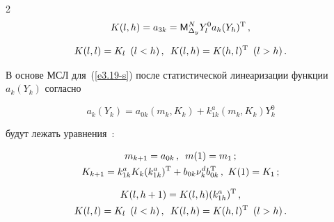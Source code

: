 \begin{multicols}{2}
    \begin{multline*}


    K(l,h) = a_{3k} = {\sf M}_{\Delta_y}^N Y_l^0 a_h (Y_h)^{\mathrm{T}}\,,

    \\[7pt]

     K(l,l) = K_l\enskip (l<h)\,,\enskip

    K(l,h) = K(h,l)^{\mathrm{T}} \enskip (l>h)\,.


    \end{multline*}



В основе МСЛ для~(\ref{e3.19-s}) после статистической линеаризации функции  $a_k(Y_k)$ согласно

    \begin{equation*}

    a_k\left(Y_k\right) = a_{0k} \left(m_k, K_k\right) + k_{1k}^a \left(m_k, K_k\right) Y_k^0


    \end{equation*}

будут лежать уравнения~\cite{4-s, 10-s}:

   \begin{gather*}

   m_{k+1} = a_{0k}\,,\enskip m(1) = m_1\,; %

   \\

    K_{k+1} = k_{1k}^a K_k (k_{1k}^a)^{\mathrm{T}} + b_{0k} \nu_k^d b_{0k}^{\mathrm{T}}\,,\  K(1)= K_1\,; %

\end{gather*}



\vspace*{-12pt}



\noindent

\begin{multline*}

    K(l,h+1) = K(l,h) (k_{1h}^a)^{\mathrm{T}}\,,

\\

    K(l,l) = K_l \enskip  (l<h)\,,\enskip

     K(l,h) = K(h,l)^{\mathrm{T}}  \enskip (l>h)\,.


\end{multline*}
\end{multicols}
